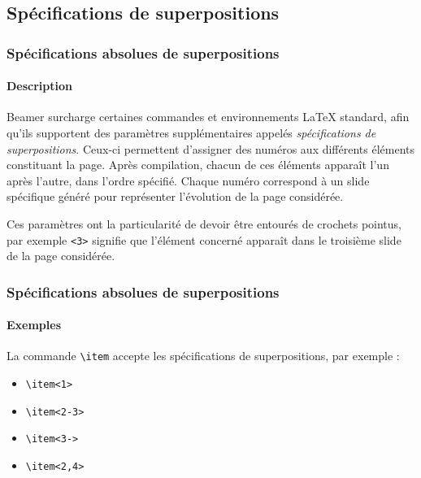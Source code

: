 \documentclass[10pt,    %
    french,             %
    xcolor=table,       %
    envcountsect,       %
    aspectratio=43      %
]{beamer}
\begin{document}
\subsection{Spécifications de superpositions}
\begin{frame}
    \frametitle{Spécifications absolues de superpositions}
    \framesubtitle{Description}
    
    Beamer surcharge certaines commandes et environnements \LaTeX{} standard, afin qu'ils supportent des paramètres supplémentaires appelés \textit{spécifications de superpositions}. Ceux-ci permettent d'assigner des numéros aux différents éléments constituant la page. Après compilation, chacun de ces éléments apparaît l'un après l'autre, dans l'ordre spécifié. Chaque numéro correspond à un slide spécifique généré pour représenter l'évolution de la page considérée.
    
    \medskip
    Ces paramètres ont la particularité de devoir être entourés de crochets pointus, par exemple \texttt{<3>} signifie que l'élément concerné apparaît dans le troisième slide de la page considérée.   
\end{frame}

\begin{frame}
    \frametitle{Spécifications absolues de superpositions}
    \framesubtitle{Exemples}
    
    La commande \texttt{\textbackslash{}item} accepte les spécifications de superpositions, par exemple :
    \begin{itemize}
       \item<1> \texttt{\textbackslash{}item<1>}
       \item<2-3> \texttt{\textbackslash{}item<2-3>}
       \item<3-> \texttt{\textbackslash{}item<3->}
       \item<2,4> \texttt{\textbackslash{}item<2,4>}
    \end{itemize}
    
    \medskip
    
    \medskip
\end{frame}
\end{document}
